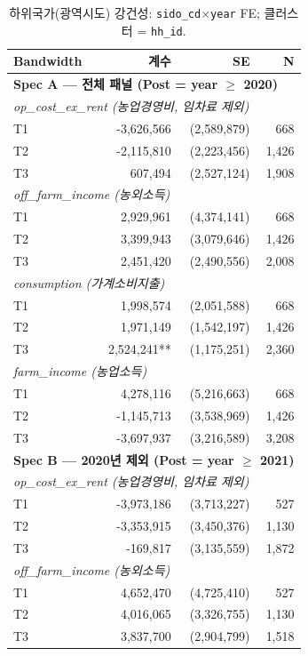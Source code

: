 \begin{table}[t]
\centering
\caption{하위국가(광역시도) 강건성: \texttt{sido\_cd}$\times$\texttt{year} FE; 클러스터 = \texttt{hh\_id}.}
\label{tab:sido_robustness_ko}
\begin{tabular}{lrrr}
\toprule
Bandwidth & 계수 & SE & N \\
\midrule
\multicolumn{4}{l}{\textbf{Spec A — 전체 패널 (Post = year $\ge$ 2020)}} \\
\multicolumn{4}{l}{\textit{op\_cost\_ex\_rent (농업경영비, 임차료 제외)}} \\
T1 & -3,626,566 & (2,589,879) & 668 \\
T2 & -2,115,810 & (2,223,456) & 1,426 \\
T3 & 607,494 & (2,527,124) & 1,908 \\
\multicolumn{4}{l}{\textit{off\_farm\_income (농외소득)}} \\
T1 & 2,929,961 & (4,374,141) & 668 \\
T2 & 3,399,943 & (3,079,646) & 1,426 \\
T3 & 2,451,420 & (2,490,556) & 2,008 \\
\multicolumn{4}{l}{\textit{consumption (가계소비지출)}} \\
T1 & 1,998,574 & (2,051,588) & 668 \\
T2 & 1,971,149 & (1,542,197) & 1,426 \\
T3 & 2,524,241** & (1,175,251) & 2,360 \\
\multicolumn{4}{l}{\textit{farm\_income (농업소득)}} \\
T1 & 4,278,116 & (5,216,663) & 668 \\
T2 & -1,145,713 & (3,538,969) & 1,426 \\
T3 & -3,697,937 & (3,216,589) & 3,208 \\
\midrule
\multicolumn{4}{l}{\textbf{Spec B — 2020년 제외 (Post = year $\ge$ 2021)}} \\
\multicolumn{4}{l}{\textit{op\_cost\_ex\_rent (농업경영비, 임차료 제외)}} \\
T1 & -3,973,186 & (3,713,227) & 527 \\
T2 & -3,353,915 & (3,450,376) & 1,130 \\
T3 & -169,817 & (3,135,559) & 1,872 \\
\multicolumn{4}{l}{\textit{off\_farm\_income (농외소득)}} \\
T1 & 4,652,470 & (4,725,410) & 527 \\
T2 & 4,016,065 & (3,326,755) & 1,130 \\
T3 & 3,837,700 & (2,904,799) & 1,518 \\

\end{tabular}
\end{table}
